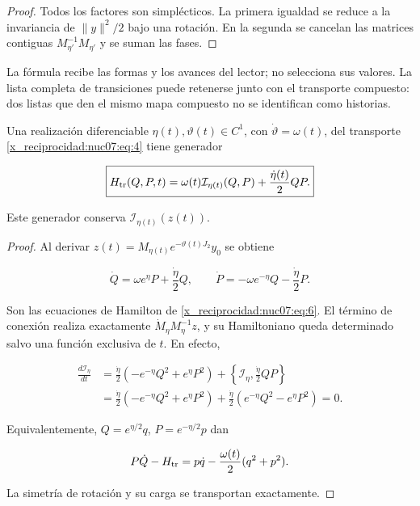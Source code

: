 \begin{proof}
Todos los factores son simplécticos. La primera igualdad se reduce a la invariancia de \(\|y\|^2/2\) bajo una rotación. En la segunda se cancelan las matrices contiguas \(M_{\eta'}^{-1}M_{\eta'}\) y se suman las fases.
\end{proof}

La fórmula recibe las formas y los avances del lector; no selecciona sus valores. La lista completa de transiciones puede retenerse junto con el transporte compuesto: dos listas que den el mismo mapa compuesto no se identifican como historias.

\begin{proposition}
Una realización diferenciable \(\eta(t),\vartheta(t)\in C^1\), con \(\dot\vartheta=\omega(t)\), del transporte \eqref{x_reciprocidad:nuc07:eq:4} tiene generador

\begin{equation}
\boxed{
H_{\rm tr}(Q,P,t)=
\omega(t)\mathcal I_{\eta(t)}(Q,P)
+\frac{\dot\eta(t)}2 QP.}
\label{x_reciprocidad:nuc07:eq:6}
\end{equation}

Este generador conserva \(\mathcal I_{\eta(t)}(z(t))\).
\end{proposition}

\begin{proof}
Al derivar
\(z(t)=M_{\eta(t)}e^{-\vartheta(t)J_2}y_0\) se obtiene

\[
\dot Q=\omega e^\eta P+\frac{\dot\eta}2Q,\qquad
\dot P=-\omega e^{-\eta}Q-\frac{\dot\eta}2P.
\]

Son las ecuaciones de Hamilton de \eqref{x_reciprocidad:nuc07:eq:6}. El término de conexión realiza exactamente \(\dot M_\eta M_\eta^{-1}z\), y su Hamiltoniano queda determinado salvo una función exclusiva de \(t\). En efecto,

\begin{equation}
\begin{aligned}
\frac{d\mathcal I_\eta}{dt}
&=\frac{\dot\eta}{2}(-e^{-\eta}Q^2+e^\eta P^2)
+\left\{\mathcal I_\eta,\frac{\dot\eta}{2}QP\right\}\\
&=\frac{\dot\eta}{2}(-e^{-\eta}Q^2+e^\eta P^2)
+\frac{\dot\eta}{2}(e^{-\eta}Q^2-e^\eta P^2)=0.
\end{aligned}
\label{x_reciprocidad:nuc07:eq:7}
\end{equation}

Equivalentemente, \(Q=e^{\eta/2}q\), \(P=e^{-\eta/2}p\) dan

\begin{equation}
P\dot Q-H_{\rm tr}
=p\dot q-\frac{\omega(t)}2(q^2+p^2).
\label{x_reciprocidad:nuc07:eq:8}
\end{equation}

La simetría de rotación y su carga se transportan exactamente.
\end{proof}

